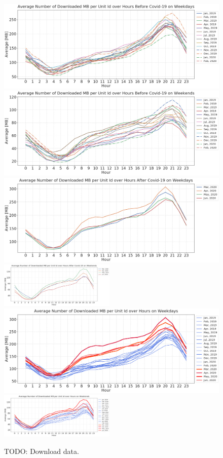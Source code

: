 \documentclass[conference,10pt]{IEEEtran}
\begin{document}
\begin{figure}[t]
  \centering
  \includegraphics[width=.49\textwidth]{figs/wenjun/download_wdays_before.png}
  \includegraphics[width=.49\textwidth]{figs/wenjun/download_wends_before.png}
  \includegraphics[width=.49\textwidth]{figs/wenjun/download_wdays_after.png}
  \includegraphics[width=0.49\textwidth]{figs/wenjun/download_wends_after.png}
  \includegraphics[width=.49\textwidth]{figs/wenjun/download_wdays_compare.png}
  \includegraphics[width=0.49\textwidth]{figs/wenjun/download_wends_compare.png}

  \vspace*{-1em}
  \caption{TODO: Download data.}
    \vspace*{-1em}
  \label{fig:download-data-per-user-hours-fig}  
\end{figure}
\end{document}
